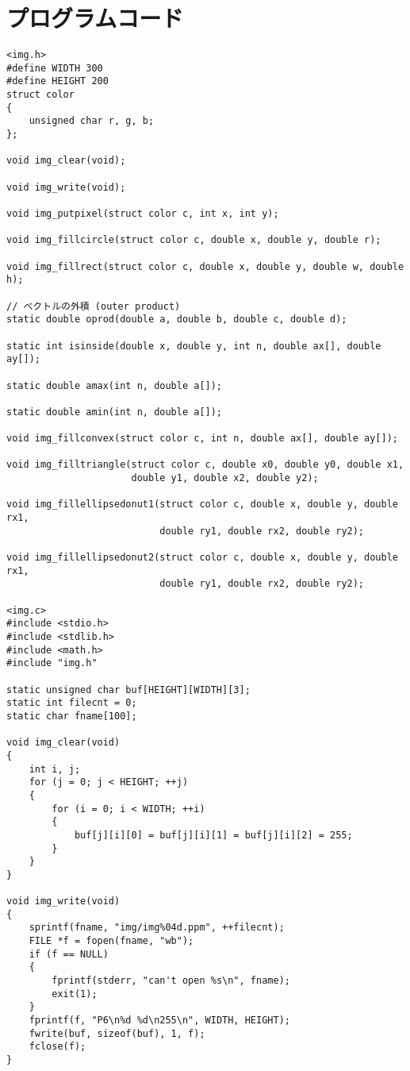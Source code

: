 \documentclass[12pt,a4j]{jarticle}
\begin{document}
\section{プログラムコード}

\begin{verbatim}
<img.h>
#define WIDTH 300
#define HEIGHT 200
struct color
{
    unsigned char r, g, b;
};

void img_clear(void);

void img_write(void);

void img_putpixel(struct color c, int x, int y);

void img_fillcircle(struct color c, double x, double y, double r);

void img_fillrect(struct color c, double x, double y, double w, double h);

// ベクトルの外積 (outer product)
static double oprod(double a, double b, double c, double d);

static int isinside(double x, double y, int n, double ax[], double ay[]);

static double amax(int n, double a[]);

static double amin(int n, double a[]);

void img_fillconvex(struct color c, int n, double ax[], double ay[]);

void img_filltriangle(struct color c, double x0, double y0, double x1, 
                      double y1, double x2, double y2);

void img_fillellipsedonut1(struct color c, double x, double y, double rx1, 
                           double ry1, double rx2, double ry2);

void img_fillellipsedonut2(struct color c, double x, double y, double rx1, 
                           double ry1, double rx2, double ry2);

<img.c>
#include <stdio.h>
#include <stdlib.h>
#include <math.h>
#include "img.h"

static unsigned char buf[HEIGHT][WIDTH][3];
static int filecnt = 0;
static char fname[100];

void img_clear(void)
{
    int i, j;
    for (j = 0; j < HEIGHT; ++j)
    {
        for (i = 0; i < WIDTH; ++i)
        {
            buf[j][i][0] = buf[j][i][1] = buf[j][i][2] = 255;
        }
    }
}

void img_write(void)
{
    sprintf(fname, "img/img%04d.ppm", ++filecnt);
    FILE *f = fopen(fname, "wb");
    if (f == NULL)
    {
        fprintf(stderr, "can't open %s\n", fname);
        exit(1);
    }
    fprintf(f, "P6\n%d %d\n255\n", WIDTH, HEIGHT);
    fwrite(buf, sizeof(buf), 1, f);
    fclose(f);
}


\end{verbatim}
\end{document}
